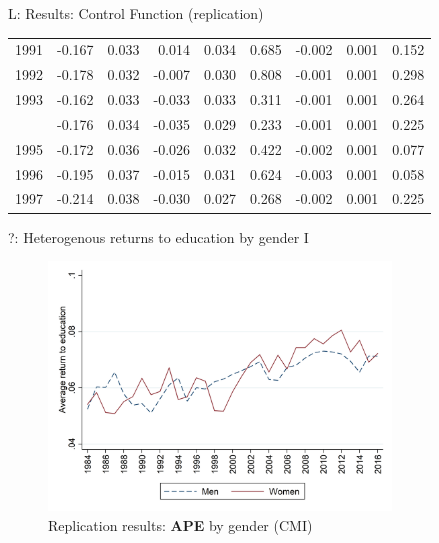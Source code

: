 \documentclass[10pt,ignorenonframetext,]{beamer}
\begin{document}
\begin{frame}{L: Results: Control Function (replication)}
\begin{longtable}[t]{rrrrrrrrr}
1991 & -0.167 & 0.033 & 0.014 & 0.034 & 0.685 & -0.002 & 0.001 & 0.152\\
1992 & -0.178 & 0.032 & -0.007 & 0.030 & 0.808 & -0.001 & 0.001 & 0.298\\
1993 & -0.162 & 0.033 & -0.033 & 0.033 & 0.311 & -0.001 & 0.001 & 0.264\\
\addlinespace
1994 & -0.176 & 0.034 & -0.035 & 0.029 & 0.233 & -0.001 & 0.001 & 0.225\\
1995 & -0.172 & 0.036 & -0.026 & 0.032 & 0.422 & -0.002 & 0.001 & 0.077\\
1996 & -0.195 & 0.037 & -0.015 & 0.031 & 0.624 & -0.003 & 0.001 & 0.058\\
1997 & -0.214 & 0.038 & -0.030 & 0.027 & 0.268 & -0.002 & 0.001 & 0.225\\*
\end{longtable}\endgroup{}

\end{frame}

\begin{frame}{?: Heterogenous returns to education by gender I}
\protect\hypertarget{heterogenous-returns-to-education-by-gender-i}{}

\begin{figure}
\centering
\includegraphics[width=\textwidth,height=2.60417in]{img/results_sex.png}
\caption{Replication results: \textbf{APE} by gender (CMI)}
\end{figure}

\end{frame}
\end{document}
